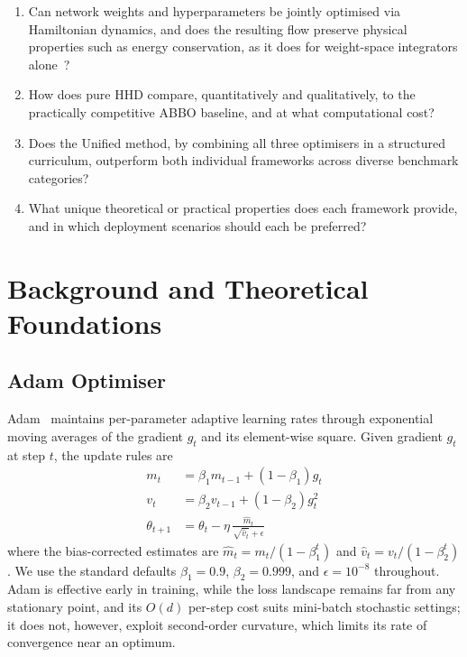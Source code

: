 \documentclass[11pt]{article}
\theoremstyle{definition}
\begin{document}
\begin{enumerate}[leftmargin=*, label=\textbf{RQ\arabic*.}]
\item Can network weights and hyperparameters be jointly optimised
      via Hamiltonian dynamics, and does the resulting flow preserve
      physical properties such as energy conservation, as it does
      for weight-space integrators alone~\cite{duruisseaux2021adaptive}?
\item How does pure HHD compare, quantitatively and qualitatively, to
      the practically competitive ABBO baseline, and at what
      computational cost?
\item Does the Unified method, by combining all three optimisers in
      a structured curriculum, outperform both individual frameworks
      across diverse benchmark categories?
\item What unique theoretical or practical properties does each
      framework provide, and in which deployment scenarios should
      each be preferred?
\end{enumerate}


\section{Background and Theoretical Foundations}

\subsection{Adam Optimiser}

Adam~\cite{kingma2015adam} maintains per-parameter adaptive learning
rates through exponential moving averages of the gradient $g_t$ and
its element-wise square. Given gradient $g_t$ at step $t$, the
update rules are
\begin{align}
m_t &= \beta_1 m_{t-1} + (1-\beta_1)g_t \label{eq:adam1}\\
v_t &= \beta_2 v_{t-1} + (1-\beta_2)g_t^2 \label{eq:adam2}\\
\theta_{t+1} &= \theta_t - \eta\,\frac{\hat{m}_t}{\sqrt{\hat{v}_t}+\epsilon}
\label{eq:adam3}
\end{align}
where the bias-corrected estimates are $\hat{m}_t = m_t/(1-\beta_1^t)$
and $\hat{v}_t = v_t/(1-\beta_2^t)$. We use the standard defaults
$\beta_1 = 0.9$, $\beta_2 = 0.999$, and $\epsilon = 10^{-8}$
throughout. Adam is effective early in training, while the loss
landscape remains far from any stationary point, and its $O(d)$
per-step cost suits mini-batch stochastic settings; it does not,
however, exploit second-order curvature, which limits its rate of
convergence near an optimum.
\end{document}
